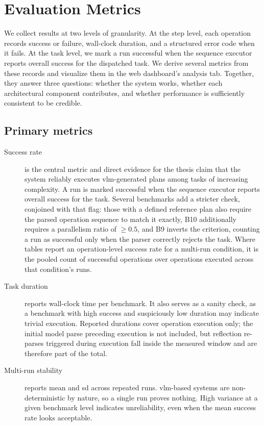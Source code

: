 \section{Evaluation Metrics}\label{sec:evaluation-metrics}
We collect results at two levels of granularity. At the step level, each operation records success or failure, wall-clock duration, and a structured error code when it fails. At the task level, we mark a run successful when the sequence executor reports overall success for the dispatched task. We derive several metrics from these records and visualize them in the web dashboard’s analysis tab. Together, they answer three questions: whether the system works, whether each architectural component contributes, and whether performance is sufficiently consistent to be credible.

\subsection{Primary metrics}
\begin{description}
	\item[Success rate] is the central metric and direct evidence for the thesis claim that the system reliably executes \gls{vlm}-generated plans among tasks of increasing complexity. A run is marked successful when the sequence executor reports overall success for the task. Several benchmarks add a stricter check, conjoined with that flag: those with a defined reference plan also require the parsed operation sequence to match it exactly, B10 additionally requires a parallelism ratio of $\geq 0.5$, and B9 inverts the criterion, counting a run as successful only when the parser correctly rejects the task. Where tables report an operation-level success rate for a multi-run condition, it is the pooled count of successful operations over operations executed across that condition’s runs.
	\item[Task duration] reports wall-clock time per benchmark. It also serves as a sanity check, as a benchmark with high success and suspiciously low duration may indicate trivial execution. Reported durations cover operation execution only; the initial model parse preceding execution is not included, but reflection re-parses triggered during execution fall inside the measured window and are therefore part of the total.
	\item[Multi-run stability] reports mean and \gls{sd} across repeated runs. \gls{vlm}-based systems are non-deterministic by nature, so a single run proves nothing. High variance at a given benchmark level indicates unreliability, even when the mean success rate looks acceptable.
\end{description}

